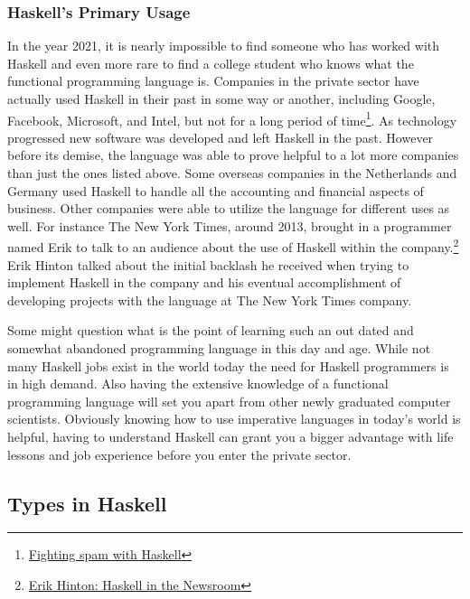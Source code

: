 \documentclass{article}
\begin{document}
        \subsubsection{Haskell's Primary Usage}
        In the year 2021, it is nearly impossible to find someone who has worked with Haskell and even more rare to find a college student who knows what the functional programming language is. Companies in the private sector have actually used Haskell in their past in some way or another, including Google, Facebook, Microsoft, and Intel, but not for a long period of time\footnote{\href{https://engineering.fb.com/2015/06/26/security/fighting-spam-with-haskell/}{Fighting spam with Haskell}}. As technology progressed new software was developed and left Haskell in the past. However before its demise, the language was able to prove helpful to a lot more companies than just the ones listed above. Some overseas companies in the Netherlands and Germany used Haskell to handle all the accounting and financial aspects of business. Other companies were able to utilize the language for different uses as well. For instance The New York Times, around 2013, brought in a programmer named Erik to talk to an audience about the use of Haskell within the company.\footnote{\href{https://www.infoq.com/presentations/haskell-newsroom-nyt/}{Erik Hinton: Haskell in the Newsroom}} Erik Hinton talked about the initial backlash he received when trying to implement Haskell in the company and his eventual accomplishment of developing projects with the language at The New York Times company.
        
        \medskip \noindent Some might question what is the point of learning such an out dated and somewhat abandoned programming language in this day and age. While not many Haskell jobs exist in the world today the need for Haskell programmers is in high demand. Also having the extensive knowledge of a functional programming language will set you apart from other newly graduated computer scientists. Obviously knowing how to use imperative languages in today's world is helpful, having to understand Haskell can grant you a bigger advantage with life lessons and job experience before you enter the private sector.

\subsection{Types in Haskell}
\end{document}
